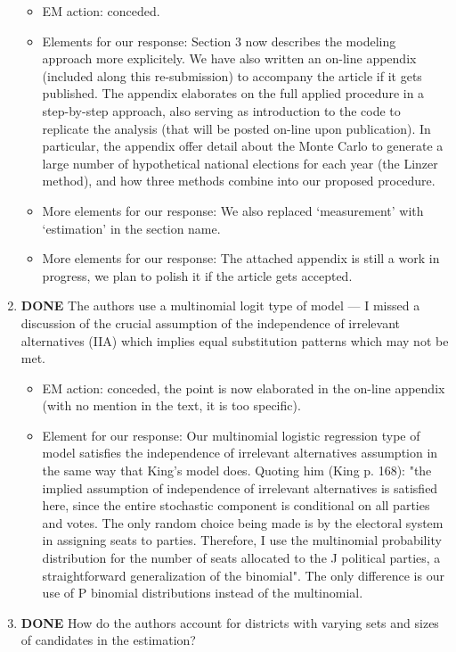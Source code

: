\documentclass{article}
\begin{document}
\begin{enumerate}
\label{sec:orgheadline25}
\begin{itemize}
\item EM action: conceded.
\item Elements for our response: Section 3 now describes the modeling approach more explicitely. We have also written an on-line appendix (included along this re-submission) to accompany the article if it gets published. The appendix elaborates on the full applied procedure in a step-by-step approach, also serving as introduction to the code to replicate the analysis (that will be posted on-line upon publication). In particular, the appendix offer detail about the Monte Carlo to generate a large number of hypothetical national elections for each year (the Linzer method), and how three methods combine into our proposed procedure.
\item More elements for our response: We also replaced `measurement' with `estimation' in the section name.
\item More elements for our response: The attached appendix is still a work in progress, we plan to polish it if the article gets accepted.
\end{itemize}
\item {\bfseries\sffamily DONE} The authors use a multinomial logit type of model --- I missed a discussion of the crucial assumption of the independence of irrelevant alternatives (IIA) which implies equal substitution patterns which may not be met.
\label{sec:orgheadline26}
\begin{itemize}
\item EM action: conceded, the point is now elaborated in the on-line appendix (with no mention in the text, it is too specific).
\item Element for our response: Our multinomial logistic regression type of model satisfies the independence of irrelevant alternatives assumption in the same way that King's model does. Quoting him (King p. 168): "the implied assumption of independence of irrelevant alternatives is satisfied here, since the entire stochastic component is conditional on all parties and votes. The only random choice being made is by the electoral system in assigning seats to parties. Therefore, I use the multinomial probability distribution for the number of seats allocated to the J political parties, a straightforward generalization of the binomial". The only difference is our use of P binomial distributions instead of the multinomial.
\end{itemize}
\item {\bfseries\sffamily DONE} How do the authors account for districts with varying sets and sizes of candidates in the estimation?

\end{enumerate}
\end{document}
